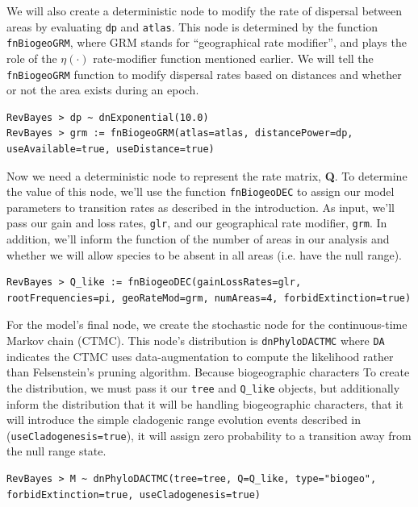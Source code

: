 \documentclass[11pt]{article}
\begin{document}
We will also create a deterministic node to modify the rate of dispersal between areas by evaluating {\tt dp} and {\tt atlas}.
This node is determined by the function {\tt fnBiogeoGRM}, where GRM stands for ``geographical rate modifier'', and plays the role of the $\eta(\cdot)$ rate-modifier function mentioned earlier.
We will tell the {\tt fnBiogeoGRM} function to modify dispersal rates based on distances and whether or not the area exists during an epoch.

\begin{snugshade}
\begin{lstlisting}
RevBayes > dp ~ dnExponential(10.0)
RevBayes > grm := fnBiogeoGRM(atlas=atlas, distancePower=dp, useAvailable=true, useDistance=true)
\end{lstlisting}
\end{snugshade}

Now we need a deterministic node to represent the rate matrix, {\bf Q}.
To determine the value of this node, we'll use the function {\tt fnBiogeoDEC} to assign our model parameters to transition rates as described in the introduction.
As input, we'll pass our gain and loss rates, {\tt glr}, and our geographical rate modifier, {\tt grm}.
In addition, we'll inform the function of the number of areas in our analysis and whether we will allow species to be absent in all areas (i.e. have the null range).

\begin{snugshade}
\begin{lstlisting}
RevBayes > Q_like := fnBiogeoDEC(gainLossRates=glr, rootFrequencies=pi, geoRateMod=grm, numAreas=4, forbidExtinction=true)
\end{lstlisting}
\end{snugshade}

For the model's final node, we create the stochastic node for the continuous-time Markov chain (CTMC).
This node's distribution is {\tt dnPhyloDACTMC} where {\tt DA} indicates the CTMC uses data-augmentation to compute the likelihood rather than Felsenstein's pruning algorithm.
Because biogeographic characters 
To create the distribution, we must pass it our {\tt tree} and {\tt Q_like} objects, but additionally inform the distribution that it will be handling biogeographic characters, that it will introduce the simple cladogenic range evolution events described in \citet{ree08} ({\tt useCladogenesis=true}), it will assign zero probability to a transition away from the null range state.

\begin{snugshade}
\begin{lstlisting}
RevBayes > M ~ dnPhyloDACTMC(tree=tree, Q=Q_like, type="biogeo", forbidExtinction=true, useCladogenesis=true)
\end{lstlisting}
\end{snugshade}
\end{document}
